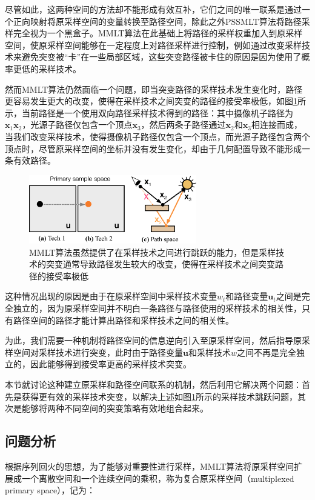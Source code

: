 尽管如此，这两种空间的方法却不能形成有效互补，它们之间的唯一联系是通过一个正向映射将原采样空间的变量转换至路径空间，除此之外PSSMLT算法将路径采样完全视为一个黑盒子。MMLT算法在此基础上将路径的采样权重加入到原采样空间，使原采样空间能够在一定程度上对路径采样进行控制，例如通过改变采样技术来避免突变被“卡”在一些局部区域，这些突变路径被卡住的原因是因为使用了概率更低的采样技术。

然而MMLT算法仍然面临一个问题，即当突变路径的采样技术发生变化时，路径更容易发生更大的改变，使得在采样技术之间突变的路径的接受率极低，如图\ref{f:mlt-disruptive-changes}所示，当前路径是一个使用双向路径采样技术得到的路径：其中摄像机子路径为$\mathbf{x}_1\mathbf{x}_2$，光源子路径仅包含一个顶点$\mathbf{x}_3$，然后两条子路径通过$\mathbf{x}_2$和$\mathbf{x}_3$相连接而成，当我们改变采样技术，使得摄像机子路径仅包含一个顶点，而光源子路径包含两个顶点时，尽管原采样空间的坐标并没有发生变化，却由于几何配置导致不能形成一条有效路径。

\begin{figure}
	\sidecaption
	\includegraphics[width=0.65\textwidth]{figures/mlt/disruptive-changes}
	\caption{MMLT算法虽然提供了在采样技术之间进行跳跃的能力，但是采样技术的突变通常导致路径发生较大的改变，使得在采样技术之间突变路径的接受率极低}
	\label{f:mlt-disruptive-changes}
\end{figure}

这种情况出现的原因是由于在原采样空间中采样技术变量$w_t$和路径变量$\mathbf{u}_t$之间是完全独立的，因为原采样空间并不明白一条路径与路径使用的采样技术的相关性，只有路径空间的路径才能计算出路径和采样技术之间的相关性。

为此，我们需要一种机制将路径空间的信息逆向引入至原采样空间，然后指导原采样空间对采样技术进行突变，此时由于路径变量$\mathbf{u}$和采样技术$w$之间不再是完全独立的，因此能够得到接受率更高的采样技术突变。

本节就讨论这种建立原采样和路径空间联系的机制，然后利用它解决两个问题：首先是获得更有效的采样技术突变，以解决上述如图\ref{f:mlt-disruptive-changes}所示的采样技术跳跃问题，其次是能够将两种不同空间的突变策略有效地组合起来。




\subsection{问题分析}
根据序列回火的思想，为了能够对重要性进行采样，MMLT算法将原采样空间扩展成一个离散空间和一个连续空间的乘积，称为复合原采样空间（multiplexed primary space），记为：

